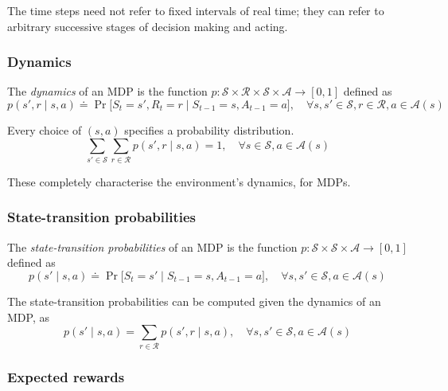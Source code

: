 The time steps need not refer to fixed intervals of real time; they can refer to arbitrary successive stages of decision making and acting.

\subsubsection{Dynamics}\label{sec:mdp-dynamics}

The \textit{dynamics} of an MDP is the function \( p: \mathcal{S} \times \mathcal{R} \times \mathcal{S} \times \mathcal{A} \to [0, 1] \) defined as
\begin{equation}
    p(s', r \mid s, a) \doteq \Pr \big[ S_{t} = s', R_{t} = r \mid S_{t-1} = s, A_{t-1} = a \big]
    , \quad \forall s, s' \in \mathcal{S}, r \in \mathcal{R}, a \in \mathcal{A}(s)
\end{equation}

Every choice of \( (s, a) \) specifies a probability distribution.
\begin{equation}
    \sum_{s' \in \mathcal{S}} \sum_{r \in \mathcal{R}} p(s', r \mid s, a) = 1
    , \quad \forall s \in \mathcal{S}, a \in \mathcal{A}(s)
\end{equation}

These completely characterise the environment's dynamics, for MDPs.

\subsubsection{State-transition probabilities}

The \textit{state-transition probabilities} of an MDP is the function \( p: \mathcal{S} \times \mathcal{S} \times \mathcal{A} \to [0, 1] \) defined as
\begin{equation}
    p(s' \mid s, a) \doteq \Pr \big[ S_{t} = s' \mid S_{t-1} = s, A_{t-1} = a \big]
    , \quad \forall s, s' \in \mathcal{S}, a \in \mathcal{A}(s)
\end{equation}

The state-transition probabilities can be computed given the dynamics of an MDP, as
\begin{equation}
    p(s' \mid s, a) = \sum_{r \in \mathcal{R}} p(s', r \mid s, a)
    , \quad \forall s, s' \in \mathcal{S}, a \in \mathcal{A}(s)
\end{equation}

\subsubsection{Expected rewards}

